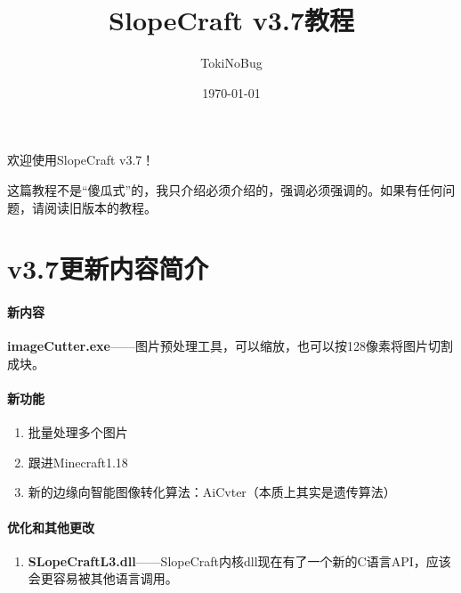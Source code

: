 \documentclass[UTF8]{ctexart}
\title{SlopeCraft v3.7教程}
\author{TokiNoBug}
\date{\today}
\begin{document}
    \maketitle
    
    欢迎使用SlopeCraft v3.7！

    这篇教程不是“傻瓜式”的，我只介绍必须介绍的，强调必须强调的。如果有任何问题，请阅读旧版本的教程。

    \section{v3.7更新内容简介}
    \paragraph{新内容}
    
        \textbf{imageCutter.exe}——图片预处理工具，可以缩放，也可以按128像素将图片切割成块。
    \paragraph{新功能}
    \begin{enumerate}
        \item 批量处理多个图片
        \item 跟进Minecraft1.18
        \item 新的边缘向智能图像转化算法：AiCvter（本质上其实是遗传算法）
    \end{enumerate}

    \paragraph{优化和其他更改}
    \begin{enumerate}
        \item \textbf{SLopeCraftL3.dll}——SlopeCraft内核dll现在有了一个新的C语言API，应该会更容易被其他语言调用。
    \end{enumerate}
\end{document}
